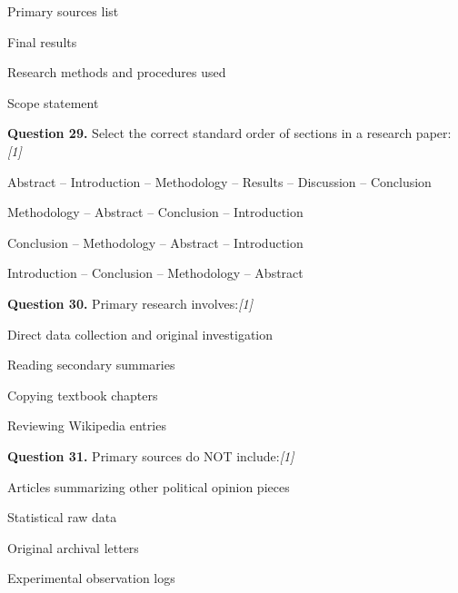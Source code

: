 \documentclass[11pt,a4paper]{article}
\newcommand{\pts}[1]{\hfill   \textit{[#1]}}
\begin{document}
\begin{parts}
  \item Primary sources list
  \item Final results
  \item Research methods and procedures used
  \item Scope statement
\end{parts}

\medskip




\noindent   \textbf{Question 29.} Select the correct standard order of sections in a research paper:\pts{1}

\begin{parts}
  \item Abstract -- Introduction -- Methodology -- Results -- Discussion -- Conclusion
  \item Methodology -- Abstract -- Conclusion -- Introduction
  \item Conclusion -- Methodology -- Abstract -- Introduction
  \item Introduction -- Conclusion -- Methodology -- Abstract
\end{parts}

\medskip




\noindent   \textbf{Question 30.} Primary research involves:\pts{1}

\begin{parts}
  \item Direct data collection and original investigation
  \item Reading secondary summaries
  \item Copying textbook chapters
  \item Reviewing Wikipedia entries
\end{parts}

\medskip




\noindent   \textbf{Question 31.} Primary sources do NOT include:\pts{1}

\begin{parts}
  \item Articles summarizing other political opinion pieces
  \item Statistical raw data
  \item Original archival letters
  \item Experimental observation logs
\end{parts}

\medskip
\end{document}
